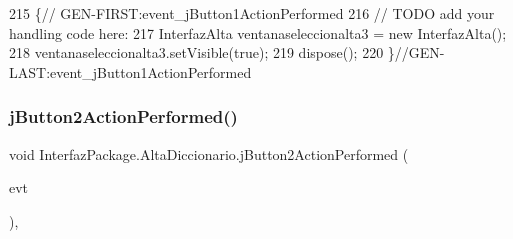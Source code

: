 \begin{DoxyCode}
215                                                                          \{\textcolor{comment}{//
      GEN-FIRST:event\_jButton1ActionPerformed}
216         \textcolor{comment}{// TODO add your handling code here:}
217         InterfazAlta ventanaseleccionalta3 = \textcolor{keyword}{new} InterfazAlta();
218         ventanaseleccionalta3.setVisible(\textcolor{keyword}{true});
219         dispose();
220     \}\textcolor{comment}{//GEN-LAST:event\_jButton1ActionPerformed}
\end{DoxyCode}
\mbox{\label{class_interfaz_package_1_1_alta_diccionario_aff2a0ab5bc48880d9115539f9dfbca78}} 
\subsubsection{\texorpdfstring{j\+Button2\+Action\+Performed()}{jButton2ActionPerformed()}}
{\footnotesize\ttfamily void Interfaz\+Package.\+Alta\+Diccionario.\+j\+Button2\+Action\+Performed (\begin{DoxyParamCaption}\item[{java.\+awt.\+event.\+Action\+Event}]{evt }\end{DoxyParamCaption})\hspace{0.3cm}{\ttfamily [inline]}, {\ttfamily [private]}}


